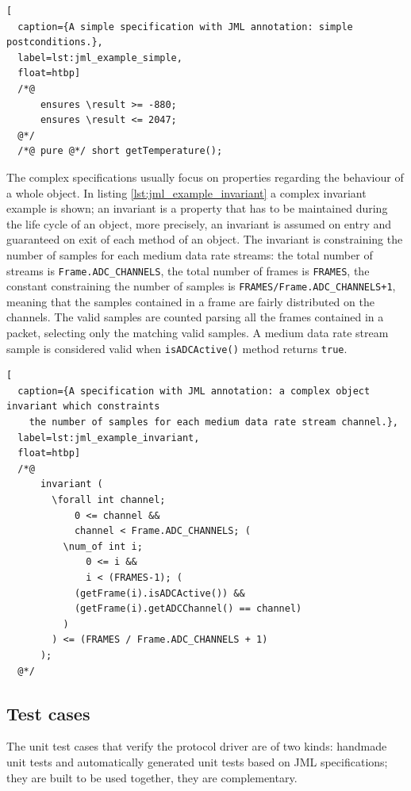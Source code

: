 \documentclass[english]{lni}
\newcommand{\lil}[1]{\texttt{\lstinline|#1|}}
\begin{document}
\begin{lstlisting}[
  caption={A simple specification with JML annotation: simple postconditions.},
  label=lst:jml_example_simple,
  float=htbp]
  /*@ 
      ensures \result >= -880; 
      ensures \result <= 2047; 
  @*/ 
  /*@ pure @*/ short getTemperature();
\end{lstlisting}

\sloppy

The complex specifications usually focus on properties regarding the behaviour of a whole object.
In listing \ref{lst:jml_example_invariant} a complex invariant example is shown; an invariant is a property that has to be maintained during the life cycle of an object, more precisely, an invariant is assumed on entry and guaranteed on exit of each method of an object. 
The invariant is constraining the number of samples for each medium data rate streams: the total number of streams is \lil{Frame.ADC_CHANNELS}, the total number of frames is \lil{FRAMES}, the constant constraining the number of samples is \lil{FRAMES/Frame.ADC_CHANNELS+1}, meaning that the samples contained in a frame are fairly distributed on the channels.
The valid samples are counted parsing all the frames contained in a packet, selecting only the matching valid samples.  
A medium data rate stream sample is considered valid when \lil{isADCActive()} method returns \lil{true}.

\fussy

\begin{lstlisting}[
  caption={A specification with JML annotation: a complex object invariant which constraints 
    the number of samples for each medium data rate stream channel.},
  label=lst:jml_example_invariant,
  float=htbp]
  /*@ 
      invariant ( 
        \forall int channel; 
            0 <= channel && 
            channel < Frame.ADC_CHANNELS; ( 
          \num_of int i; 
              0 <= i && 
              i < (FRAMES-1); (
            (getFrame(i).isADCActive()) && 
            (getFrame(i).getADCChannel() == channel)
          ) 
        ) <= (FRAMES / Frame.ADC_CHANNELS + 1) 
      ); 
  @*/
\end{lstlisting}



\subsection{Test cases}
\label{subsec:test_cases}

The unit test cases that verify the protocol driver are of two kinds: handmade unit tests and automatically generated unit tests based on JML specifications; they are built to be used together, they are complementary.  
\end{document}
